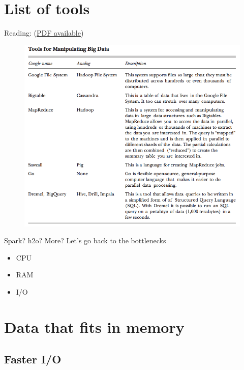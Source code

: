 \documentclass[]{book}
\providecommand{\tightlist}{%
  \setlength{\itemsep}{0pt}\setlength{\parskip}{0pt}}
\theoremstyle{definition}
\theoremstyle{definition}
\theoremstyle{definition}
\theoremstyle{remark}
\begin{document}
\section{List of tools}\label{list-of-tools}

Reading: \citet{Varian2014}
(\href{http://pubs.aeaweb.org/doi/pdfplus/10.1257/jep.28.2.3}{PDF
available})

\begin{figure}

{\centering \includegraphics[width=10.39in]{images/ch6_tool_list} 

}

\end{figure}

Spark? h2o? More? Let's go back to the bottlenecks

\begin{itemize}
\tightlist
\item
  CPU
\item
  RAM
\item
  I/O
\end{itemize}

\section{Data that fits in memory}\label{data-that-fits-in-memory}

\subsection{Faster I/O}\label{faster-io}
\end{document}

